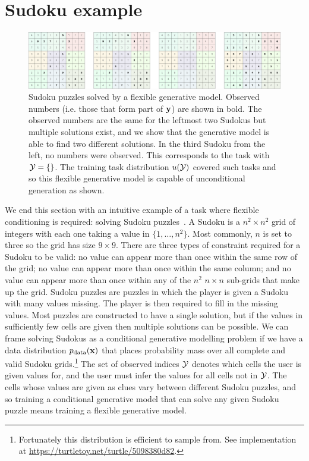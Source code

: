 \section{Sudoku example}
\begin{figure}[t]
    \centering
    \includegraphics[width=\textwidth]{figs/thesis/sudoku_panel.pdf}
    \caption{Sudoku puzzles solved by a flexible generative model. Observed numbers (i.e. those that form part of ${\mathbf{y}}$) are shown in bold. The observed numbers are the same for the leftmost two Sudokus but multiple solutions exist, and we show that the generative model is able to find two different solutions. In the third Sudoku from the left, no numbers were observed. This corresponds to the task with ${\mathcal{Y}} = \{\}$. The training task distribution $u({\mathcal{Y}})$ covered such tasks and so this flexible generative model is capable of unconditional generation as shown. }
    \label{fig:sudoku-panel}
\end{figure}
We end this section with an intuitive example of a task where flexible conditioning is required: solving Sudoku puzzles~\citep{weilbach2023graphically}. A Sudoku is a $n^2 \times n^2$ grid of integers with each one taking a value in $\{1,\ldots,n^2\}$. Most commonly, $n$ is set to three so the grid has size $9 \times 9$. There are three types of constraint required for a Sudoku to be valid: no value can appear more than once within the same row of the grid; no value can appear more than once within the same column; and no value can appear more than once within any of the $n^2$ $n \times n$ sub-grids that make up the grid. Sudoku puzzles are puzzles in which the player is given a Sudoku with many values missing. The player is then required to fill in the missing values. Most puzzles are constructed to have a single solution, but if the values in sufficiently few cells are given then multiple solutions can be possible. We can frame solving Sudokus as a conditional generative modelling problem if we have a data distribution $p_{\rm{data}}({\mathbf{x}})$ that places probability mass over all complete and valid Sudoku grids.\footnote{Fortunately this distribution is efficient to sample from. See implementation at \url{https://turtletoy.net/turtle/5098380d82}.} The set of observed indices ${\mathcal{Y}}$ denotes which cells the user is given values for, and the user must infer the values for all cells not in ${\mathcal{Y}}$. The cells whose values are given as clues vary between different Sudoku puzzles, and so training a conditional generative model that can solve any given Sudoku puzzle means training a flexible generative model. 

